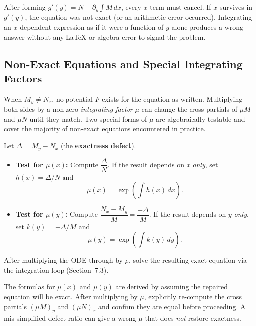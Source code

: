 \begin{warningbox}
After forming $g'(y) = N - \partial_y\!\int M\,dx$, every $x$-term must
cancel. If $x$ survives in $g'(y)$, the equation was not exact (or an
arithmetic error occurred). Integrating an $x$-dependent expression as if it
were a function of $y$ alone produces a wrong answer without any LaTeX or
algebra error to signal the problem.
\end{warningbox}

\subsection{Non-Exact Equations and Special Integrating Factors}

When $M_y \neq N_x$, no potential $F$ exists for the equation as written.
Multiplying both sides by a non-zero \emph{integrating factor} $\mu$ can
change the cross partials of $\mu M$ and $\mu N$ until they match. Two
special forms of $\mu$ are algebraically testable and cover the majority of
non-exact equations encountered in practice.

\begin{formulabox}
Let $\Delta = M_y - N_x$ (the \textbf{exactness defect}).
\begin{itemize}[leftmargin=1.4em, itemsep=4pt]
    \item \textbf{Test for $\mu(x)$:} Compute $\dfrac{\Delta}{N}$.
          If the result depends on $x$ \emph{only}, set $h(x)=\Delta/N$ and
          \[
            \mu(x) = \exp\!\left(\int h(x)\,dx\right).
          \]
    \item \textbf{Test for $\mu(y)$:} Compute $\dfrac{N_x - M_y}{M}
          = \dfrac{-\Delta}{M}$.
          If the result depends on $y$ \emph{only}, set $k(y)=-\Delta/M$ and
          \[
            \mu(y) = \exp\!\left(\int k(y)\,dy\right).
          \]
\end{itemize}
After multiplying the ODE through by $\mu$, solve the resulting exact equation
via the integration loop (Section~7.3).
\end{formulabox}

\begin{warningbox}
The formulas for $\mu(x)$ and $\mu(y)$ are derived by assuming the repaired
equation will be exact. After multiplying by $\mu$, explicitly re-compute the
cross partials $(\mu M)_y$ and $(\mu N)_x$ and confirm they are equal before
proceeding. A mis-simplified defect ratio can give a wrong $\mu$ that does
\emph{not} restore exactness.
\end{warningbox}

